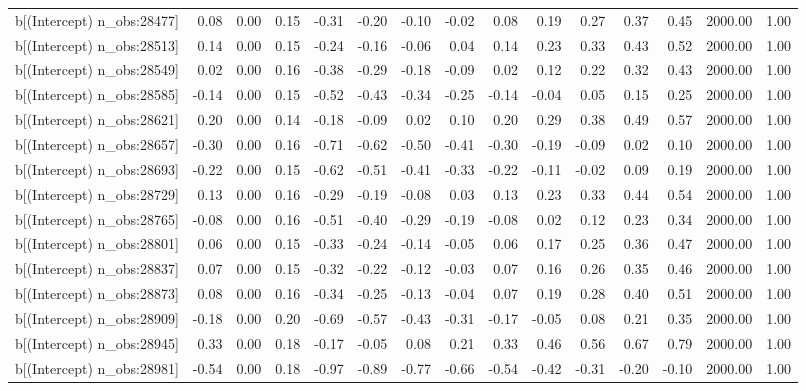 \begin{table}[ht]
\begin{tabular}{rrrrrrrrrrrrrrr}
  b[(Intercept) n\_obs:28477] & 0.08 & 0.00 & 0.15 & -0.31 & -0.20 & -0.10 & -0.02 & 0.08 & 0.19 & 0.27 & 0.37 & 0.45 & 2000.00 & 1.00 \\ 
  b[(Intercept) n\_obs:28513] & 0.14 & 0.00 & 0.15 & -0.24 & -0.16 & -0.06 & 0.04 & 0.14 & 0.23 & 0.33 & 0.43 & 0.52 & 2000.00 & 1.00 \\ 
  b[(Intercept) n\_obs:28549] & 0.02 & 0.00 & 0.16 & -0.38 & -0.29 & -0.18 & -0.09 & 0.02 & 0.12 & 0.22 & 0.32 & 0.43 & 2000.00 & 1.00 \\ 
  b[(Intercept) n\_obs:28585] & -0.14 & 0.00 & 0.15 & -0.52 & -0.43 & -0.34 & -0.25 & -0.14 & -0.04 & 0.05 & 0.15 & 0.25 & 2000.00 & 1.00 \\ 
  b[(Intercept) n\_obs:28621] & 0.20 & 0.00 & 0.14 & -0.18 & -0.09 & 0.02 & 0.10 & 0.20 & 0.29 & 0.38 & 0.49 & 0.57 & 2000.00 & 1.00 \\ 
  b[(Intercept) n\_obs:28657] & -0.30 & 0.00 & 0.16 & -0.71 & -0.62 & -0.50 & -0.41 & -0.30 & -0.19 & -0.09 & 0.02 & 0.10 & 2000.00 & 1.00 \\ 
  b[(Intercept) n\_obs:28693] & -0.22 & 0.00 & 0.15 & -0.62 & -0.51 & -0.41 & -0.33 & -0.22 & -0.11 & -0.02 & 0.09 & 0.19 & 2000.00 & 1.00 \\ 
  b[(Intercept) n\_obs:28729] & 0.13 & 0.00 & 0.16 & -0.29 & -0.19 & -0.08 & 0.03 & 0.13 & 0.23 & 0.33 & 0.44 & 0.54 & 2000.00 & 1.00 \\ 
  b[(Intercept) n\_obs:28765] & -0.08 & 0.00 & 0.16 & -0.51 & -0.40 & -0.29 & -0.19 & -0.08 & 0.02 & 0.12 & 0.23 & 0.34 & 2000.00 & 1.00 \\ 
  b[(Intercept) n\_obs:28801] & 0.06 & 0.00 & 0.15 & -0.33 & -0.24 & -0.14 & -0.05 & 0.06 & 0.17 & 0.25 & 0.36 & 0.47 & 2000.00 & 1.00 \\ 
  b[(Intercept) n\_obs:28837] & 0.07 & 0.00 & 0.15 & -0.32 & -0.22 & -0.12 & -0.03 & 0.07 & 0.16 & 0.26 & 0.35 & 0.46 & 2000.00 & 1.00 \\ 
  b[(Intercept) n\_obs:28873] & 0.08 & 0.00 & 0.16 & -0.34 & -0.25 & -0.13 & -0.04 & 0.07 & 0.19 & 0.28 & 0.40 & 0.51 & 2000.00 & 1.00 \\ 
  b[(Intercept) n\_obs:28909] & -0.18 & 0.00 & 0.20 & -0.69 & -0.57 & -0.43 & -0.31 & -0.17 & -0.05 & 0.08 & 0.21 & 0.35 & 2000.00 & 1.00 \\ 
  b[(Intercept) n\_obs:28945] & 0.33 & 0.00 & 0.18 & -0.17 & -0.05 & 0.08 & 0.21 & 0.33 & 0.46 & 0.56 & 0.67 & 0.79 & 2000.00 & 1.00 \\ 
  b[(Intercept) n\_obs:28981] & -0.54 & 0.00 & 0.18 & -0.97 & -0.89 & -0.77 & -0.66 & -0.54 & -0.42 & -0.31 & -0.20 & -0.10 & 2000.00 & 1.00 \\ 

\end{tabular}
\end{table}
